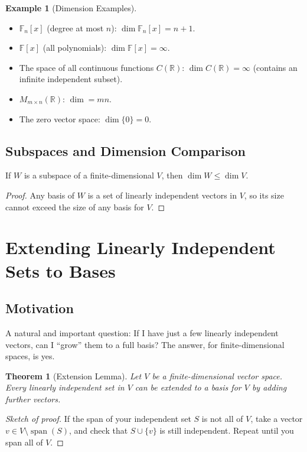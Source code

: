 \documentclass[11pt]{article}
\theoremstyle{definition}
\newtheorem{example}[definition]{Example}
\theoremstyle{plain}
\newtheorem{theorem}[definition]{Theorem}
\begin{document}
\begin{example}[Dimension Examples]
\begin{itemize}
    \item $\mathbb{F}_n[x]$ (degree at most $n$): $\dim \mathbb{F}_n[x] = n+1$.
    \item $\mathbb{F}[x]$ (all polynomials): $\dim \mathbb{F}[x] = \infty$.
    \item The space of all continuous functions $C(\mathbb{R})$: $\dim C(\mathbb{R}) = \infty$ (contains an infinite independent subset).
    \item $M_{m \times n}(\mathbb{R})$: $\dim = mn$.
    \item The zero vector space: $\dim\{0\} = 0$.
\end{itemize}
\end{example}

\subsection{Subspaces and Dimension Comparison}

If $W$ is a subspace of a finite-dimensional $V$, then $\dim W \leq \dim V$.

\begin{proof}
Any basis of $W$ is a set of linearly independent vectors in $V$, so its size cannot exceed the size of any basis for $V$.
\end{proof}

\section{Extending Linearly Independent Sets to Bases}

\subsection{Motivation}

A natural and important question: If I have just a few linearly independent vectors, can I ``grow'' them to a full basis? The answer, for finite-dimensional spaces, is yes.

\begin{theorem}[Extension Lemma]
Let $V$ be a finite-dimensional vector space. Every linearly independent set in $V$ can be extended to a basis for $V$ by adding further vectors.
\end{theorem}

\begin{proof}[Sketch of proof]
If the span of your independent set $S$ is not all of $V$, take a vector $v \in V \setminus \operatorname{span}(S)$, and check that $S \cup \{v\}$ is still independent. Repeat until you span all of $V$.
\end{proof}
\end{document}
